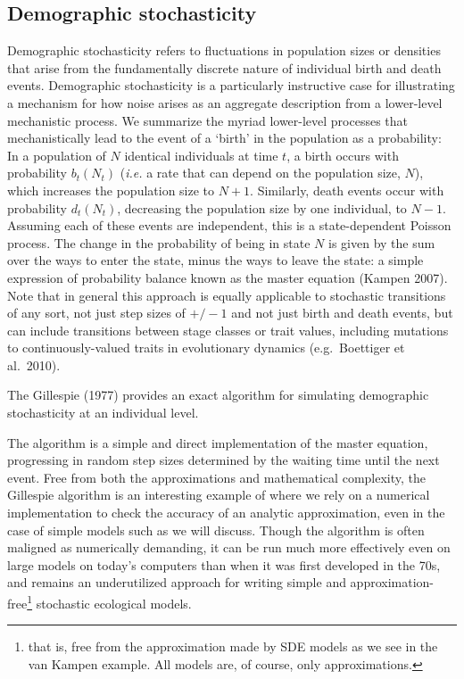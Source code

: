 \documentclass[
  authoryear,
  preprint,
  3p]{elsarticle}
\begin{document}
\subsection{Demographic stochasticity}\label{demographic-stochasticity}

Demographic stochasticity refers to fluctuations in population sizes or
densities that arise from the fundamentally discrete nature of
individual birth and death events. Demographic stochasticity is a
particularly instructive case for illustrating a mechanism for how noise
arises as an aggregate description from a lower-level mechanistic
process. We summarize the myriad lower-level processes that
mechanistically lead to the event of a `birth' in the population as a
probability: In a population of \(N\) identical individuals at time
\(t\), a birth occurs with probability \(b_t(N_t)\) (\emph{i.e.} a rate
that can depend on the population size, \(N\)), which increases the
population size to \(N+1\). Similarly, death events occur with
probability \(d_t(N_t)\), decreasing the population size by one
individual, to \(N-1\). Assuming each of these events are independent,
this is a state-dependent Poisson process. The change in the probability
of being in state \(N\) is given by the sum over the ways to enter the
state, minus the ways to leave the state: a simple expression of
probability balance known as the master equation (Kampen 2007). Note
that in general this approach is equally applicable to stochastic
transitions of any sort, not just step sizes of \(+/- 1\) and not just
birth and death events, but can include transitions between stage
classes or trait values, including mutations to continuously-valued
traits in evolutionary dynamics (e.g.~Boettiger et al.~2010).

The Gillespie (1977) provides an exact algorithm for simulating
demographic stochasticity at an individual level.

The algorithm is a simple and direct implementation of the master
equation, progressing in random step sizes determined by the waiting
time until the next event. Free from both the approximations and
mathematical complexity, the Gillespie algorithm is an interesting
example of where we rely on a numerical implementation to check the
accuracy of an analytic approximation, even in the case of simple models
such as we will discuss. Though the algorithm is often maligned as
numerically demanding, it can be run much more effectively even on large
models on today's computers than when it was first developed in the 70s,
and remains an underutilized approach for writing simple and
approximation-free\footnote{that is, free from the approximation made by
  SDE models as we see in the van Kampen example. All models are, of
  course, only approximations.} stochastic ecological models.
\end{document}
